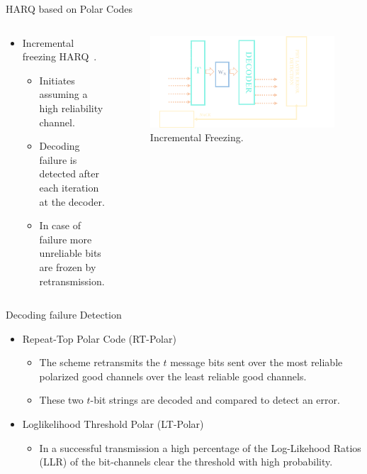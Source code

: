 \documentclass[final,hyperref={pdfpagelabels=false}]{beamer}
\begin{document}
\begin{frame}[t]
\begin{columns}[t]
\begin{column}{.465\textwidth}
\begin{block}{HARQ based on Polar Codes}
\begin{columns} %
\begin{column}{.5\textwidth}
\begin{itemize}
\item Incremental freezing HARQ~\cite{KC}.
\begin{itemize}
\item Initiates assuming a high reliability channel.
\item Decoding failure is detected after each iteration at the decoder.
\item In case of failure more unreliable bits are frozen by retransmission.
\end{itemize}
\end{itemize}
\end{column}
\begin{column}{.5\textwidth}
\begin{figure}
\includegraphics[width=1\linewidth]{PHYHARQ.png}
\caption{Incremental Freezing.}
\end{figure}
\end{column}
\end{columns}
\end{block}

\begin{block}{Decoding failure Detection}
\begin{itemize}
\item Repeat-Top Polar Code (RT-Polar)
\begin{itemize}
\item The scheme retransmits the $t$ message bits sent over the most reliable
polarized good channels over the least reliable good channels.
\item These two $t$-bit strings are decoded and compared to detect an error. 
\end{itemize}
\item Loglikelihood Threshold Polar (LT-Polar)
\begin{itemize}
\item In a successful transmission a high percentage of the Log-Likehood Ratios (LLR) of the bit-channels clear the threshold with high probability.
\end{itemize}
\end{itemize}
\end{block}


\end{column}
\end{columns}
\end{frame}
\end{document}
